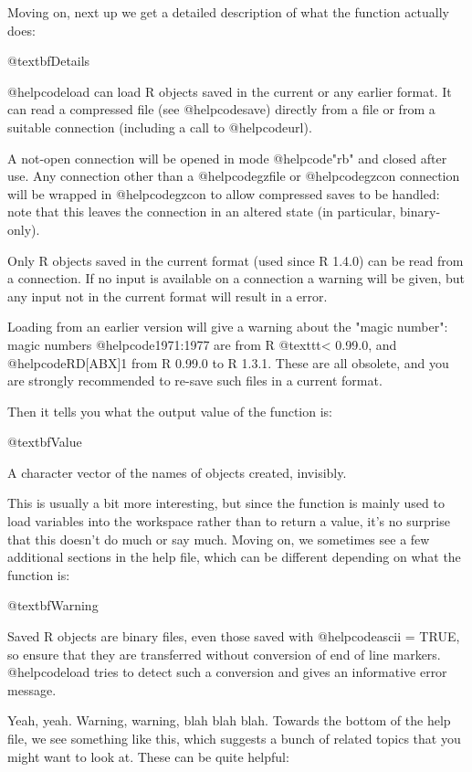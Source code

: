Moving on, next up we get a detailed description of what the function actually does: 

\begin{rhelp1}

@textbf{Details}

@helpcode{load} can load R objects saved in the current or any earlier format. It can read a
compressed file (see @helpcode{save}) directly from a file or from a suitable connection (including
a call to @helpcode{url}).

A not-open connection will be opened in mode @helpcode{"rb"} and closed after use. Any connection
other than a @helpcode{gzfile} or @helpcode{gzcon} connection will be wrapped in @helpcode{gzcon} to allow compressed 
saves to be handled: note that this leaves the connection in an altered state (in 
particular, binary-only).

Only R objects saved in the current format (used since R 1.4.0) can be read from a 
connection. If no input is available on a connection a warning will be given, but any input 
not in the current format will result in a error.

Loading from an earlier version will give a warning about the "magic number": magic 
numbers @helpcode{1971:1977} are from R @texttt{<} 0.99.0, and @helpcode{RD[ABX]1} from R 0.99.0 to R 1.3.1. These 
are all obsolete, and you are strongly recommended to re-save such files in a current 
format.

\end{rhelp1}
Then it tells you what the output value of the function is:
\begin{rhelp1}

@textbf{Value}

A character vector of the names of objects created, invisibly.

\end{rhelp1}
This is usually a bit more interesting, but since the  function is mainly used to load variables into the workspace rather than to return a value, it's no surprise that this doesn't do much or say much. Moving on, we sometimes see a few additional sections in the help file, which can be different depending on what the function is:

\begin{rhelp1}
@textbf{Warning}

Saved R objects are binary files, even those saved with @helpcode{ascii = TRUE}, so ensure that 
they are transferred without conversion of end of line markers. @helpcode{load} tries to detect such 
a conversion and gives an informative error message.

\end{rhelp1}
Yeah, yeah. Warning, warning, blah blah blah. Towards the bottom of the help file, we see something like this, which suggests a bunch of related topics that you might want to look at. These can be quite helpful:

